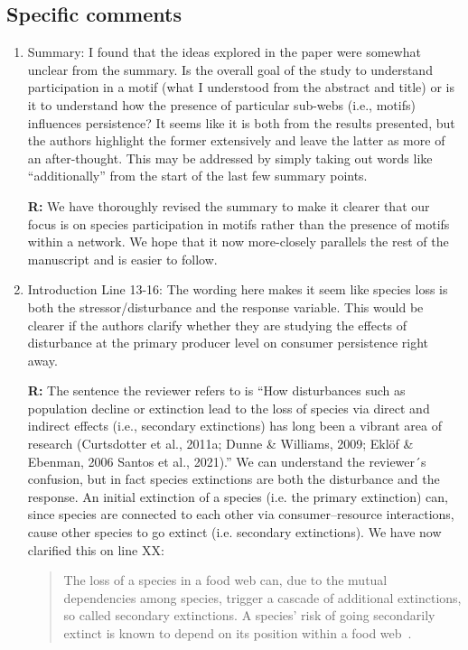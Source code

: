 \documentclass[12pt]{article}
\begin{document}
    \subsection*{Specific comments}

        \begin{enumerate}

            \item Summary: I found that the ideas explored in the paper were somewhat unclear from the summary. Is the overall goal of the study to understand participation in a motif (what I understood from the abstract and title) or is it to understand how the presence of particular sub-webs (i.e., motifs) influences persistence? It seems like it is both from the results presented, but the authors highlight the former extensively and leave the latter as more of an after-thought. This may be addressed by simply taking out words like “additionally” from the start of the last few summary points.

                \textbf{R:} We have thoroughly revised the summary to make it clearer that our focus is on species participation in motifs rather than the presence of motifs within a network. We hope that it now more-closely parallels the rest of the manuscript and is easier to follow.

    
            \item Introduction Line 13-16: The wording here makes it seem like species loss is both the stressor/disturbance and the response variable. This would be clearer if the authors clarify whether they are studying the effects of disturbance at the primary producer level on consumer persistence right away. 

                \textbf{R:} The sentence the reviewer refers to is ``How disturbances such as population decline or extinction lead to the loss of species via  direct and indirect effects (i.e., secondary extinctions) has long been a vibrant area of research (Curtsdotter et al., 2011a; Dunne & Williams, 2009; Eklöf \& Ebenman, 2006 Santos et al., 2021).'' We can understand the reviewer´s confusion, but in fact species extinctions are both the disturbance and the response.
                An initial extinction of a species (i.e. the primary extinction) can, since species are connected to each other via  consumer--resource interactions, cause other species to go extinct (i.e. secondary extinctions). We have now clarified this on line XX: 

                \begin{quotation}
                The loss of a species in a food web can, due to the mutual dependencies among species, trigger a cascade of additional extinctions, so called secondary extinctions. A species' risk of going secondarily extinct is known to depend on its position within a food web~\citep{Santos2021,curtsdotter2011robustness, dunne2009cascading, Eklof2006}.
                \end{quotation}
            

\end{enumerate}
\end{document}
